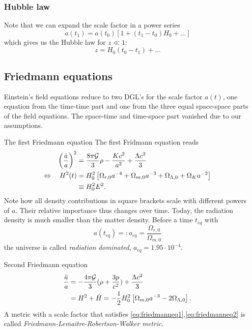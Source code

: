 \subsubsection{Hubble law}
Note that we can expand the scale factor in a power series
\begin{equation}
	a(t_1) = a(t_0) \left[1+(t_1-t_0)H_0+\dots\right]
\end{equation}
which gives us the Hubble law for $z\ll 1$:
\begin{equation}
	z=H_0 (t_0-t_1)+\dots
\end{equation}
\subsection{Friedmann equations}
Einstein's field equations reduce to two DGL's for the scale factor $a(t)$, one equation from the time-time part and one from the three equal space-space parts of the field equations. The space-time and time-space part vanished due to our assumptions. 
\begin{mybox}{The first Friedmann equation}
	The first Fridmann equation reads
	\begin{align}
		\label{eq:friedmanneq1}
		\left(\frac{\dot{a}}{a}\right)^2 &= \frac{8 \pi \mathcal{G}}{3 }\rho - \frac{K c^2}{a^2} + \frac{\Lambda c^2}{3} \nonumber \\
		\Leftrightarrow \quad H^2(t) &= H^2_0 \left[\Omega_{r,0} a^{-4} + \Omega_{m,0} a^{-3} + \Omega_{\Lambda,0} + \Omega_K a^{-2}\right]\nonumber \\
		&\equiv H^2_0 E^2.
	\end{align}
Note how all  density contributions in square brackets scale with different powers of $a$. Their relative importance thus changes over time. Today, the radiation density is much smaller than the matter density. Before a time $t_{eq}$ with
\begin{equation}
	a(t_{eq}) =: a_{eq} = \frac{\Omega_{r,0}}{\Omega_{m,0}}
\end{equation}
the universe is called \emph{radiation dominated}, $a_{eq} = 1.95 \cdot 10^{-4}$.
\end{mybox}
\begin{mybox}{Second Friedmann equation}
	\begin{align}
		\label{eq:friedmanneq2}
		\frac{\ddot{a}}{a} & = - \frac{4 \pi \mathcal{G}}{3} (\rho + \frac{3 p}{c^2}) + \frac{\Lambda c^2}{3} \\
		&= H^2 +\dot{H} = - \frac{1}{2} H^2_0 \left[\Omega_{m,0}a^{-3}-2 \Omega_{\Lambda,0}\right] \nonumber.
	\end{align}
A metric with a scale factor that satisfies \ref{eq:friedmanneq1},\ref{eq:friedmanneq2} is called \emph{Friedmann-Lemaitre-Robertson-Walker metric}.
\end{mybox}
